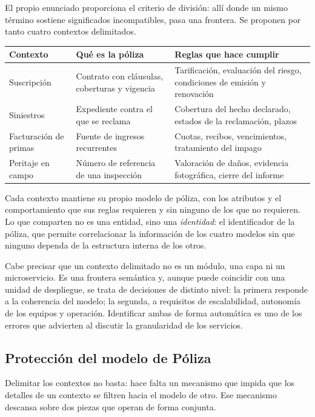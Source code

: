 El propio enunciado proporciona el criterio de división: allí donde un mismo término sostiene
significados incompatibles, pasa una frontera. Se proponen por tanto cuatro contextos delimitados.

\begin{center}
\begin{tabular}{p{3.1cm}p{4.4cm}p{5.4cm}}
\hline
\textbf{Contexto} & \textbf{Qué es la póliza} & \textbf{Reglas que hace cumplir} \\
\hline
Suscripción & Contrato con cláusulas, coberturas y vigencia & Tarificación, evaluación del riesgo, condiciones de emisión y renovación \\
\hline
Siniestros & Expediente contra el que se reclama & Cobertura del hecho declarado, estados de la reclamación, plazos \\
\hline
Facturación de primas & Fuente de ingresos recurrentes & Cuotas, recibos, vencimientos, tratamiento del impago \\
\hline
Peritaje en campo & Número de referencia de una inspección & Valoración de daños, evidencia fotográfica, cierre del informe \\
\hline
\end{tabular}
\end{center}

Cada contexto mantiene su propio modelo de póliza, con los atributos y el comportamiento que sus
reglas requieren y sin ninguno de los que no requieren. Lo que comparten no es una entidad, sino
una \emph{identidad}: el identificador de la póliza, que permite correlacionar la información de los
cuatro modelos sin que ninguno dependa de la estructura interna de los otros.

Cabe precisar que un contexto delimitado no es un módulo, una capa ni un microservicio. Es una
frontera semántica y, aunque puede coincidir con una unidad de despliegue, se trata de decisiones de
distinto nivel: la primera responde a la coherencia del modelo; la segunda, a requisitos de
escalabilidad, autonomía de los equipos y operación. Identificar ambas de forma automática es uno de
los errores que \textcite{richardsford2020} advierten al discutir la granularidad de los servicios.

\subsection*{Protección del modelo de Póliza}

Delimitar los contextos no basta: hace falta un mecanismo que impida que los detalles de un contexto
se filtren hacia el modelo de otro. Ese mecanismo descansa sobre dos piezas que operan de forma
conjunta.

